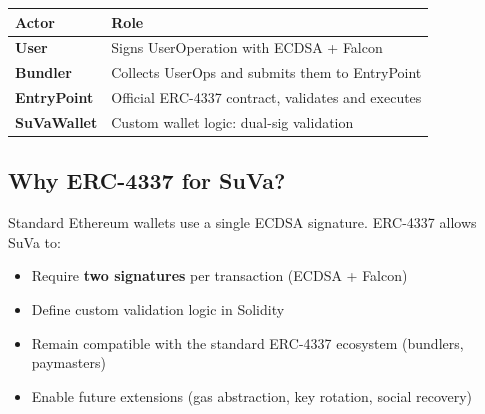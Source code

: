 \documentclass[11pt,a4paper]{article}
\begin{document}
\begin{center}
\end{center}

\begin{center}
\begin{tabular}{ll}
\toprule
\textbf{Actor} & \textbf{Role} \\
\midrule
\textbf{User}       & Signs UserOperation with ECDSA + Falcon \\
\textbf{Bundler}    & Collects UserOps and submits them to EntryPoint \\
\textbf{EntryPoint} & Official ERC-4337 contract, validates and executes \\
\textbf{SuVaWallet} & Custom wallet logic: dual-sig validation \\
\bottomrule
\end{tabular}
\end{center}

\subsection{Why ERC-4337 for SuVa?}

Standard Ethereum wallets use a single ECDSA signature. ERC-4337 allows SuVa to:
\begin{itemize}
  \item Require \textbf{two signatures} per transaction (ECDSA + Falcon)
  \item Define custom validation logic in Solidity
  \item Remain compatible with the standard ERC-4337 ecosystem (bundlers, paymasters)
  \item Enable future extensions (gas abstraction, key rotation, social recovery)
\end{itemize}
\end{document}
